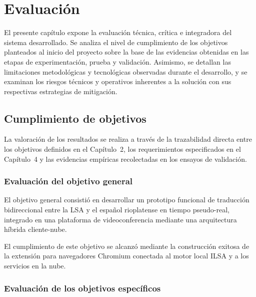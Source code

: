 \chapter{Evaluación}
\label{cap:evaluacion}

El presente capítulo expone la evaluación técnica, crítica e integradora del sistema desarrollado. Se analiza el nivel de cumplimiento de los objetivos planteados al inicio del proyecto sobre la base de las evidencias obtenidas en las etapas de experimentación, prueba y validación. Asimismo, se detallan las limitaciones metodológicas y tecnológicas observadas durante el desarrollo, y se examinan los riesgos técnicos y operativos inherentes a la solución con sus respectivas estrategias de mitigación.

\section{Cumplimiento de objetivos}
\label{sec:eval_cumplimiento_objetivos}

La valoración de los resultados se realiza a través de la trazabilidad directa entre los objetivos definidos en el Capítulo~2, los requerimientos especificados en el Capítulo~4 y las evidencias empíricas recolectadas en los ensayos de validación.

\subsection{Evaluación del objetivo general}
El objetivo general consistió en desarrollar un prototipo funcional de traducción bidireccional entre la LSA y el español rioplatense en tiempo pseudo-real, integrado en una plataforma de videoconferencia mediante una arquitectura híbrida cliente-nube.

El cumplimiento de este objetivo se alcanzó mediante la construcción exitosa de la extensión para navegadores Chromium conectada al motor local ILSA y a los servicios en la nube. 

\subsection{Evaluación de los objetivos específicos}

